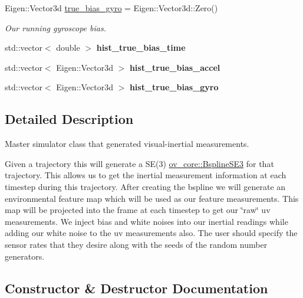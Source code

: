 \begin{DoxyCompactItemize}
Eigen\+::\+Vector3d \hyperlink{classov__init_1_1SimulatorInit_a23a46e6cdbe66968bb6d4174a1aa6861}{true\+\_\+bias\+\_\+gyro} = Eigen\+::\+Vector3d\+::\+Zero()
\begin{DoxyCompactList}\small\item\em Our running gyroscope bias. \end{DoxyCompactList}\item 
\mbox{\label{classov__init_1_1SimulatorInit_aca8eeb9e14ae34664d610f7fbf86a90c}} 
std\+::vector$<$ double $>$ {\bfseries hist\+\_\+true\+\_\+bias\+\_\+time}
\item 
\mbox{\label{classov__init_1_1SimulatorInit_a96c954fefe87f0c91421fdaa09e72dd2}} 
std\+::vector$<$ Eigen\+::\+Vector3d $>$ {\bfseries hist\+\_\+true\+\_\+bias\+\_\+accel}
\item 
\mbox{\label{classov__init_1_1SimulatorInit_a34b63849cf6d4dfc3d0376ebce213e80}} 
std\+::vector$<$ Eigen\+::\+Vector3d $>$ {\bfseries hist\+\_\+true\+\_\+bias\+\_\+gyro}
\end{DoxyCompactItemize}


\subsection{Detailed Description}
Master simulator class that generated visual-\/inertial measurements. 

Given a trajectory this will generate a S\+E(3) \hyperlink{classov__core_1_1BsplineSE3}{ov\+\_\+core\+::\+Bspline\+S\+E3} for that trajectory. This allows us to get the inertial measurement information at each timestep during this trajectory. After creating the bspline we will generate an environmental feature map which will be used as our feature measurements. This map will be projected into the frame at each timestep to get our \char`\"{}raw\char`\"{} uv measurements. We inject bias and white noises into our inertial readings while adding our white noise to the uv measurements also. The user should specify the sensor rates that they desire along with the seeds of the random number generators. 

\subsection{Constructor \& Destructor Documentation}
\mbox{\label{classov__init_1_1SimulatorInit_a6f8df388f25c2d90411bd51ade48c6e4}} 
